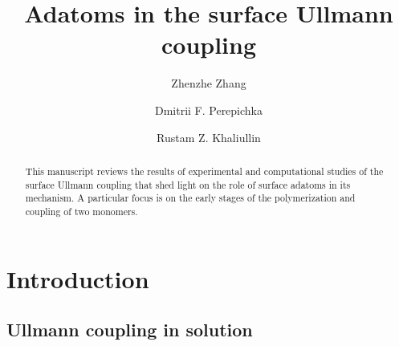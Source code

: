 \documentclass[%
 reprint,
 amsmath,amssymb,
 aps,
prb,
]{revtex4-2}
\begin{document}

\title{Adatoms in the surface Ullmann coupling}%

\author{Zhenzhe Zhang}
\author{Dmitrii F. Perepichka}%
\author{Rustam Z. Khaliullin}
%


\begin{abstract}
This manuscript reviews the results of experimental and computational studies of the surface Ullmann coupling that shed light on the role of surface adatoms in its mechanism. A particular focus is on the early stages of the polymerization and coupling of two monomers.
\end{abstract}

\maketitle



\section{Introduction}

\subsection{Ullmann coupling in solution}
\end{document}
